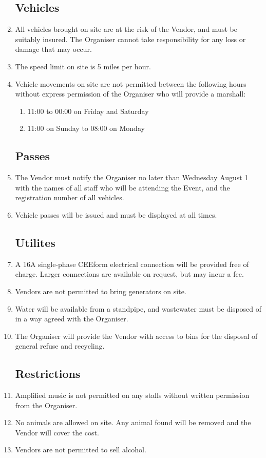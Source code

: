 \begin{enumerate}
\subsection*{Vehicles}
\item All vehicles brought on site are at the risk of the Vendor, and must be suitably insured.
        The Organiser cannot take responsibility for any loss or damage that may occur.
\item The speed limit on site is 5 miles per hour.
\item Vehicle movements on site are not permitted between the following hours without express
        permission of the Organiser who will provide a marshall:
\begin{enumerate}
    \item 11:00 to 00:00 on Friday and Saturday
    \item 11:00 on Sunday to 08:00 on Monday
\end{enumerate}

\subsection*{Passes}
\item The Vendor must notify the Organiser no later than Wednesday August 1 with the names of
        all staff who will be attending the Event, and the registration number of all vehicles.
\item Vehicle passes will be issued and must be displayed at all times.

\subsection*{Utilites}
\item A 16A single-phase CEEform electrical connection will be provided free of charge. Larger
        connections are available on request, but may incur a fee.
\item Vendors are not permitted to bring generators on site.
\item Water will be available from a standpipe, and wastewater must be disposed of in a way
        agreed with the Organiser.
\item The Organiser will provide the Vendor with access to bins for the disposal of general
        refuse and recycling.

\subsection*{Restrictions}
\item Amplified music is not permitted on any stalls without written permission from the Organiser.
\item No animals are allowed on site. Any animal found will be removed and the Vendor will
        cover the cost.
\item Vendors are not permitted to sell alcohol.


\end{enumerate}
